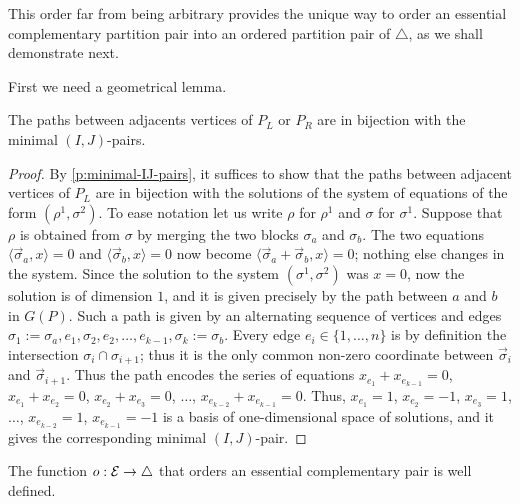 This order far from being arbitrary provides the unique way to order an essential complementary partition pair into an ordered partition pair of $\triangle$, as we shall demonstrate next.

First we need a geometrical lemma. 
\begin{proposition}
    The paths between adjacents vertices of $P_L$ or $P_R$ are in bijection with the minimal $(I,J)$-pairs.
\end{proposition}

\begin{proof}
    By \cref{p:minimal-IJ-pairs}, it suffices to show that the paths between adjacent vertices of $P_L$ are in bijection with the solutions of the system of equations of the form $(\rho^1,\sigma^2)$. 
    To ease notation let us write $\rho$ for $\rho^1$ and $\sigma$ for $\sigma^1$. 
    Suppose that $\rho$ is obtained from $\sigma$ by merging the two blocks $\sigma_a$ and $\sigma_b$. 
    The two equations $\langle \vec \sigma_a, x \rangle =0$ and $\langle \vec \sigma_b, x \rangle =0$ now become $\langle \vec \sigma_a + \vec \sigma_b, x \rangle =0$; nothing else changes in the system. 
    Since the solution to the system $(\sigma^1,\sigma^2)$ was $x=0$, now the solution is of dimension $1$, and it is given precisely by the path between $a$ and $b$ in $G(P)$.
    Such a path is given by an alternating sequence of vertices and edges $\sigma_1:=\sigma_a, e_1, \sigma_2, e_2, \ldots, e_{k-1}, \sigma_k:=\sigma_b$. 
    Every edge $e_i \in \{1,\ldots, n\}$ is by definition the intersection $\sigma_{i} \cap \sigma_{i+1}$; thus it is the only common non-zero coordinate between $\vec \sigma_{i}$ and $\vec \sigma_{i+1}$.
    Thus the path encodes the series of equations $x_{e_1}+x_{e_{k-1}}=0$, $x_{e_1}+x_{e_2}=0$, $x_{e_2}+x_{e_3}=0$, $\ldots$, $x_{e_{k-2}}+x_{e_{k-1}}=0$. 
    Thus, $x_{e_1}=1$, $x_{e_2}=-1$, $x_{e_3}=1$, $\ldots$, $x_{e_{k-2}}=1$, $x_{e_{k-1}}=-1$ is a basis of one-dimensional space of solutions, and it gives the corresponding minimal $(I,J)$-pair. 
\end{proof}

\begin{lemma} 
\label{o well defined}
The function $o:\mathcal{E} \to \triangle$ that orders an essential complementary pair is well defined.
\end{lemma}

